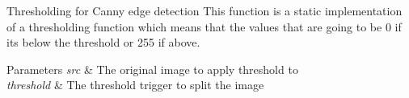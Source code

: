 Thresholding for Canny edge detection This function is a static implementation of a thresholding function which means that the values that are going to be 0 if its below the threshold or 255 if above. 


\begin{DoxyParams}{Parameters}
{\em src} & The original image to apply threshold to \\
\hline
{\em threshold} & The threshold trigger to split the image \\
\hline
\end{DoxyParams}
